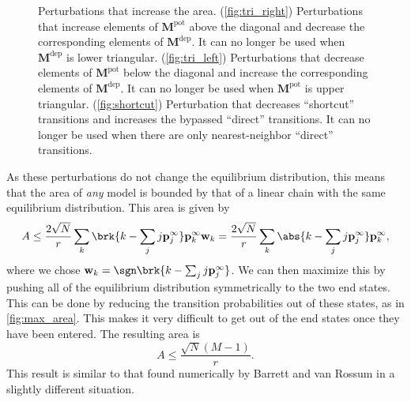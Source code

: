 \documentclass{article} %
\newcommand{\pr}{\mathbf{p}}
\newcommand{\eq}{\pr^\infty}
\newcommand{\w}{\mathbf{w}}
\newcommand{\M}{\mathbf{M}}
\newcommand{\pot}{^{\text{pot}}}
\newcommand{\dep}{^{\text{dep}}}
\begin{document}
\begin{figure}[tbp]
 \begin{center}
 \begin{myenuma}
  \item{}\label{fig:tri_right}\hp
  \item{}\label{fig:tri_left}\hp
  \item{}\label{fig:shortcut}
 \end{myenuma}
 \end{center}
  \caption{Perturbations that increase the area.
  (\ref{fig:tri_right}) Perturbations that increase elements of $\M\pot$ above the diagonal and decrease the corresponding elements of $\M\dep$. It can no longer be used when $\M\dep$ is lower triangular.
  (\ref{fig:tri_left}) Perturbations that decrease elements of $\M\pot$ below the diagonal and increase the corresponding elements of $\M\dep$. It can no longer be used when $\M\pot$ is upper triangular.
  (\ref{fig:shortcut}) Perturbation that decreases ``shortcut'' transitions and increases the bypassed ``direct'' transitions. It can no longer be used when there are only nearest-neighbor ``direct'' transitions.
  }\label{fig:perts}
\end{figure}

As these perturbations do not change the equilibrium distribution, this means that the area of \emph{any} model is bounded by that of a linear chain with the same equilibrium distribution.
This area is given by
%
\begin{equation}\label{eq:multistatearea}
  A \leq \frac{2\sqrt{N}}{r} \sum_k \brk{k - \sum_j j\eq_j} \eq_k \w_k
    = \frac{2\sqrt{N}}{r} \sum_k \abs{k - \sum_j j\eq_j} \eq_k ,
\end{equation}
%
where we chose $\w_k=\sgn\brk{k - \sum_j j\eq_j}$.
We can then maximize this by pushing all of the equilibrium distribution symmetrically to the two end states.
This can be done by reducing the transition probabilities out of these states, as in \autoref{fig:max_area}.
This makes it very difficult to get out of the end states once they have been entered.
The resulting area is
%
\begin{equation}\label{eq:max_area}
  A \leq \frac{\sqrt{N}(M-1)}{r}.
\end{equation}
%
This result is similar to that found numerically by Barrett and van Rossum \cite{Barrett2008discrete} in a slightly different situation.
\end{document}
